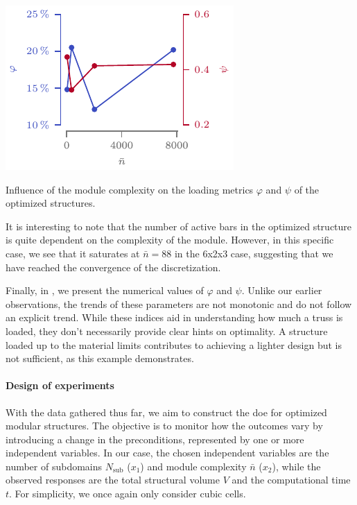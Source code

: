 \begin{marginfigure}
    \centering
    \includegraphics[width=\linewidth]{figures/05_cellular_opt/00_module_complexity_tab/comp_tab_param.pdf}
    \caption{Influence of the module complexity on the loading metrics $\varphi$ and $\psi$ of the optimized structures.}
    \label{fig:05_comp_param}
\end{marginfigure}

It is interesting to note that the number of active bars in the optimized structure is quite dependent on the complexity of the module. However, in this specific case, we see that it saturates at $\bar{n}=88$ in the 6x2x3 case, suggesting that we have reached the convergence of the discretization.

Finally, in , we present the numerical values of $\varphi$ and $\psi$. Unlike our earlier observations, the trends of these parameters are not monotonic and do not follow an explicit trend. While these indices aid in understanding how much a truss is loaded, they don't necessarily provide clear hints on optimality. A structure loaded up to the material limits contributes to achieving a lighter design but is not sufficient, as this example demonstrates.

\paragraph{Design of experiments}
With the data gathered thus far, we aim to construct the \gls{doe} for optimized modular structures. The objective is to monitor how the outcomes vary by introducing a change in the preconditions, represented by one or more independent variables. In our case, the chosen independent variables are the number of subdomains $N_\text{sub}$ ($x_1$) and module complexity $\bar{n}$ ($x_2$), while the observed responses are the total structural volume $V$ and the computational time $t$. For simplicity, we once again only consider cubic cells.

